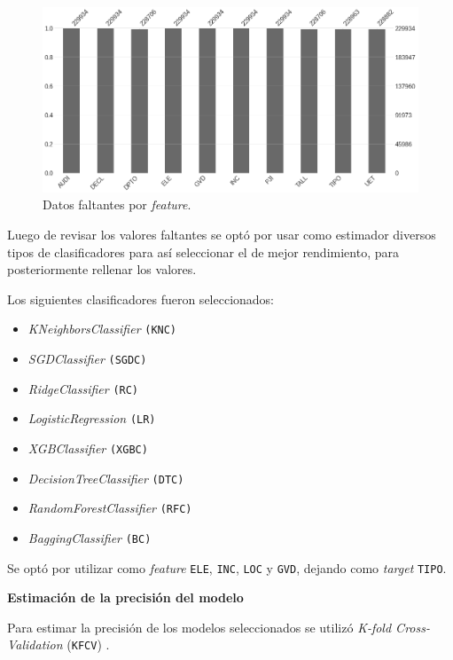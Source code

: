 \documentclass[a4paper,12pt]{article}
\begin{document}
\begin{figure}[H]
	\begin{center}
	\includegraphics[width=1\textwidth]{tesis_66.png}
  	\caption{Datos faltantes por \textit{feature}.}
  	\label{fig:missingvalue}
  	\end{center}
\end{figure}

Luego de revisar los valores faltantes se optó por usar como estimador diversos tipos de clasificadores para así seleccionar el de mejor rendimiento, para posteriormente rellenar los valores.

Los siguientes clasificadores fueron seleccionados:

\begin{itemize}
	\item \textit{KNeighborsClassifier} \texttt{(KNC)}
	\item \textit{SGDClassifier} \texttt{(SGDC)}
	\item \textit{RidgeClassifier} \texttt{(RC)}
    \item \textit{LogisticRegression} \texttt{(LR)}
    \item \textit{XGBClassifier} \texttt{(XGBC)}
    \item \textit{DecisionTreeClassifier} \texttt{(DTC)}
    \item \textit{RandomForestClassifier} \texttt{(RFC)}
    \item \textit{BaggingClassifier} \texttt{(BC)}
\end{itemize}

Se optó por utilizar como \textit{feature} \texttt{ELE}, \texttt{INC}, \texttt{LOC} y \texttt{GVD}, dejando como \textit{target} \texttt{TIPO}.

\hfill

\textbf{Estimación de la precisión del modelo}

Para estimar la precisión de los modelos seleccionados se utilizó \textit{K-fold Cross-Validation} (\texttt{KFCV}) \citep{kfolds}.
\end{document}
